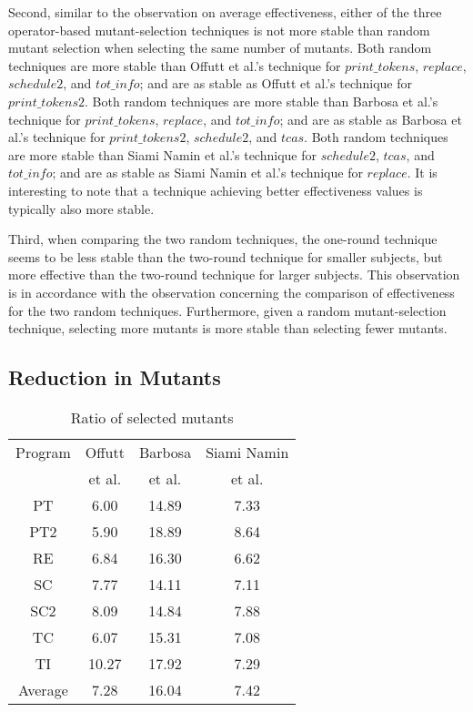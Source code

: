 Second, similar to the observation on average effectiveness,
either of the three operator-based mutant-selection techniques is
not more stable than random mutant selection when selecting the
same number of mutants. Both random techniques are more stable
than Offutt et al.'s technique for $print\_tokens$, $replace$,
$schedule2$, and $tot\_info$; and are as stable as Offutt et al.'s
technique for $print\_tokens2$. Both random techniques are more
stable than Barbosa et al.'s technique for $print\_tokens$,
$replace$, and $tot\_info$; and are as stable as Barbosa et al.'s
technique for $print\_tokens2$,  $schedule2$, and $tcas$. Both
random techniques are more stable than Siami Namin et al.'s
technique for $schedule2$, $tcas$, and $tot\_info$; and are as
stable as Siami Namin et al.'s technique for $replace$. It is
interesting to note that a technique achieving better
effectiveness values is typically also more stable.

Third, when comparing the two random techniques, the one-round
technique seems to be less stable than the two-round technique for
smaller subjects, but more effective than the two-round technique
for larger subjects. This observation is in accordance with the
observation concerning the comparison of effectiveness for the two
random techniques. Furthermore, given a random mutant-selection
technique, selecting more mutants is more stable than selecting
fewer mutants.


\vspace{-1.5ex}
\subsection{Reduction in Mutants}
\label{Reduction}


\begin{table}[t]
\caption{\label{tab:Reduction} Ratio of selected mutants}
\centering \hspace*{-0.1cm}
\begin{tabular}{|c|c|c|c|}
  \hline
  Program & Offutt  &Barbosa  & Siami Namin \\
  ~ & et al. & et al.  &  et al.\\
  \hline
  \hline
  PT&6.00 &14.89 &7.33\\
  \hline
  PT2&5.90 &18.89 &8.64\\
  \hline
  RE&6.84 &16.30 &6.62\\
  \hline
  SC&7.77 &14.11 &7.11\\
  \hline
  SC2&8.09 &14.84 &7.88\\
  \hline
  TC&6.07 &15.31 &7.08\\
  \hline
  TI&10.27 &17.92 &7.29\\
  \hline
  \hline
  Average&7.28 &16.04 &7.42\\
  \hline
\end{tabular}
\vspace{-4ex}
\end{table}

